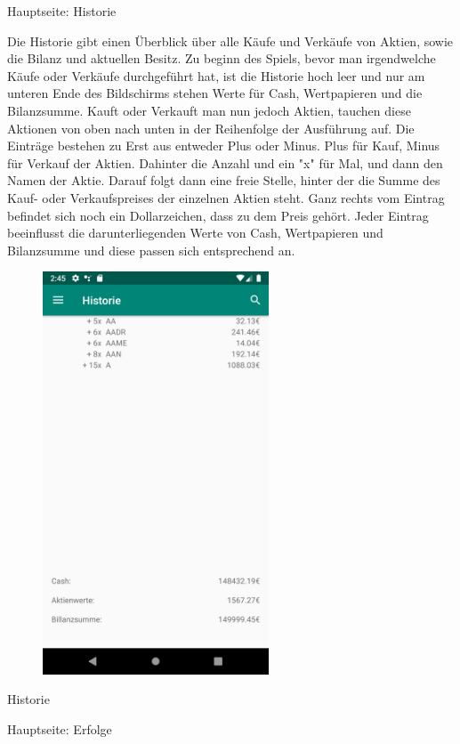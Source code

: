 \documentclass[10pt]{scrartcl}
\begin{document}
Hauptseite: Historie

Die Historie gibt einen Überblick über alle Käufe und Verkäufe von Aktien, sowie die Bilanz und aktuellen Besitz. Zu beginn des Spiels, bevor man irgendwelche Käufe oder Verkäufe durchgeführt hat, ist die Historie hoch leer und nur am unteren Ende des Bildschirms stehen Werte für Cash, Wertpapieren und die Bilanzsumme. Kauft oder Verkauft man nun jedoch Aktien, tauchen diese Aktionen von oben nach unten in der Reihenfolge der Ausführung auf. Die Einträge bestehen zu Erst aus entweder Plus oder Minus. Plus für Kauf, Minus für Verkauf der Aktien. Dahinter die Anzahl und ein "x" für Mal, und dann den Namen der Aktie. Darauf folgt dann eine freie Stelle, hinter der die Summe des Kauf- oder Verkaufspreises der einzelnen Aktien steht. Ganz rechts vom Eintrag befindet sich noch ein Dollarzeichen, dass zu dem Preis gehört.
Jeder Eintrag beeinflusst die darunterliegenden Werte von Cash, Wertpapieren und Bilanzsumme und diese passen sich entsprechend an.

\begin{figure}[H]
	\centering
	\includegraphics[width=0.6\textwidth]{Bilder/Applikation/Historie.png}
\end{figure}
Historie


Hauptseite: Erfolge
\end{document}
